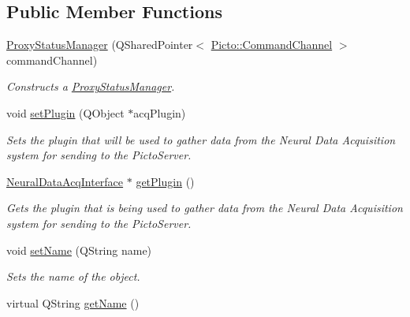 \subsection*{Public Member Functions}
\begin{DoxyCompactItemize}
\item 
\hyperlink{class_proxy_status_manager_ab95427d41862a5f2600d56d0c71ab1a9}{Proxy\-Status\-Manager} (Q\-Shared\-Pointer$<$ \hyperlink{class_picto_1_1_command_channel}{Picto\-::\-Command\-Channel} $>$ command\-Channel)
\begin{DoxyCompactList}\small\item\em Constructs a \hyperlink{class_proxy_status_manager}{Proxy\-Status\-Manager}. \end{DoxyCompactList}\item 
\hypertarget{class_proxy_status_manager_a28286636ff4af48e31098cefa8fef498}{void \hyperlink{class_proxy_status_manager_a28286636ff4af48e31098cefa8fef498}{set\-Plugin} (Q\-Object $\ast$acq\-Plugin)}\label{class_proxy_status_manager_a28286636ff4af48e31098cefa8fef498}

\begin{DoxyCompactList}\small\item\em Sets the plugin that will be used to gather data from the Neural Data Acquisition system for sending to the Picto\-Server. \end{DoxyCompactList}\item 
\hypertarget{class_proxy_status_manager_aae67ce985e975f6a7ad31428fc761365}{\hyperlink{class_neural_data_acq_interface}{Neural\-Data\-Acq\-Interface} $\ast$ \hyperlink{class_proxy_status_manager_aae67ce985e975f6a7ad31428fc761365}{get\-Plugin} ()}\label{class_proxy_status_manager_aae67ce985e975f6a7ad31428fc761365}

\begin{DoxyCompactList}\small\item\em Gets the plugin that is being used to gather data from the Neural Data Acquisition system for sending to the Picto\-Server. \end{DoxyCompactList}\item 
\hypertarget{class_proxy_status_manager_a2910b14e07438ac70ec9badc2a821f13}{void \hyperlink{class_proxy_status_manager_a2910b14e07438ac70ec9badc2a821f13}{set\-Name} (Q\-String name)}\label{class_proxy_status_manager_a2910b14e07438ac70ec9badc2a821f13}

\begin{DoxyCompactList}\small\item\em Sets the name of the object. \end{DoxyCompactList}\item 
\hypertarget{class_proxy_status_manager_a4e8cfd1539377dd308fb3551b7d0b17f}{virtual Q\-String \hyperlink{class_proxy_status_manager_a4e8cfd1539377dd308fb3551b7d0b17f}{get\-Name} ()}\label{class_proxy_status_manager_a4e8cfd1539377dd308fb3551b7d0b17f}


\end{DoxyCompactItemize}
